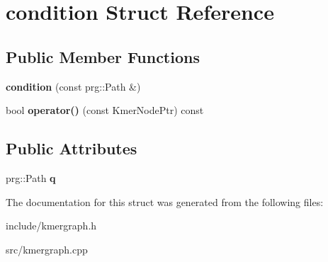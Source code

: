 \hypertarget{structcondition}{}\section{condition Struct Reference}
\label{structcondition}
\subsection*{Public Member Functions}
\begin{DoxyCompactItemize}
\item 
\mbox{\label{structcondition_a3170ab7bcff7657a72fbbbbb6592cfa5}} 
{\bfseries condition} (const prg\+::\+Path \&)
\item 
\mbox{\label{structcondition_a644d7ca96a854e7d98577ea9a975e9ad}} 
bool {\bfseries operator()} (const Kmer\+Node\+Ptr) const
\end{DoxyCompactItemize}
\subsection*{Public Attributes}
\begin{DoxyCompactItemize}
\item 
\mbox{\label{structcondition_a38d66d1824ba9fdf8d2a7cc1633593e5}} 
prg\+::\+Path {\bfseries q}
\end{DoxyCompactItemize}


The documentation for this struct was generated from the following files\+:\begin{DoxyCompactItemize}
\item 
include/kmergraph.\+h\item 
src/kmergraph.\+cpp\end{DoxyCompactItemize}
